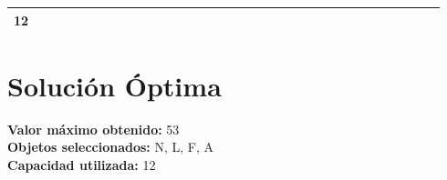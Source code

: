 \documentclass{article}
\begin{document}
\begin{center}
\begin{tabular}{|c|c|c|c|c|c|c|c|c|c|c|c|c|c|c|c|}
12 & \cellcolor{rojo}\textcolor{white}{0} & \cellcolor{verde}\textcolor{white}{15} & \cellcolor{verde}\textcolor{white}{21} & \cellcolor{rojo}\textcolor{white}{21} & \cellcolor{rojo}\textcolor{white}{21} & \cellcolor{verde}\textcolor{white}{30} & \cellcolor{verde}\textcolor{white}{37} & \cellcolor{rojo}\textcolor{white}{37} & \cellcolor{rojo}\textcolor{white}{37} & \cellcolor{rojo}\textcolor{white}{37} & \cellcolor{verde}\textcolor{white}{41} & \cellcolor{rojo}\textcolor{white}{41} & \cellcolor{verde}\textcolor{white}{52} & \cellcolor{rojo}\textcolor{white}{52} & \cellcolor{verde}\textcolor{white}{53} \\ \hline
\end{tabular}
\end{center}
\normalsize

\section*{Solución Óptima}
\textbf{Valor máximo obtenido:} 53\\
\textbf{Objetos seleccionados:} N, L, F, A\\
\textbf{Capacidad utilizada:} 12\\
\end{document}
